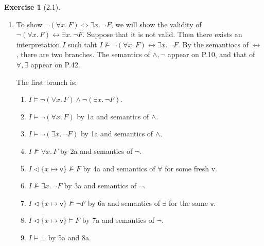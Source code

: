 \documentclass[12pt, psamsfonts]{amsart}
\theoremstyle{definition}
\newtheorem*{exer}{Exercise}
\theoremstyle{remark}
\numberwithin{equation}{subsection}
\begin{document}
\begin{exer}[2.1]
    $ $
    \begin{enumerate}[label=(\alph*)]
        \item
            To show $\neg(\forall x.\, F) \Leftrightarrow \exists x.\, \neg F$, we will show the validity of $\neg(\forall x.\, F) \leftrightarrow \exists x.\, \neg F$.
            Suppose that it is not valid.
            Then there exists an interpretation $I$ such taht $I \not\models \neg(\forall x.\, F) \leftrightarrow \exists x.\, \neg F$.
            By the semantiocs of $\leftrightarrow$, there are two branches.
            The semantics of $\land, \neg$ appear on P.10, and that of $\forall, \exists$ appear on P.42.

            The first branch is:
            \begin{enumerate}[label=\arabic*a.]
                \item %
                    $I \models \neg(\forall x.\, F) \land \neg(\exists x.\, \neg F)$.
                \item %
                    $I \models \neg(\forall x.\, F)$ by 1a and semantics of $\land$.
                \item %
                    $I \models \neg(\exists x.\, \neg F)$ by 1a and semantics of $\land$.
                \item %
                    $I \not\models \forall x.\, F$ by 2a and semantics of $\neg$.
                \item %
                    $I \vartriangleleft \{ x \mapsto \textsf{v} \} \not\models F$ by 4a and semantics of $\forall$ for some fresh \textsf{v}.
                \item %
                    $I \not \models \exists x.\, \neg F$ by 3a and semantics of $\neg$.
                \item %
                    $I \vartriangleleft \{ x \mapsto \textsf{v} \} \not\models \neg F$ by 6a and semantics of $\exists$ for the same $\textsf{v}$.
                \item %
                    $I \vartriangleleft \{ x \mapsto \textsf{v} \} \models F$ by 7a and semantics of $\neg$.
                \item %
                    $I \models \bot$ by 5a and 8a.
            \end{enumerate}


\end{enumerate}
\end{exer}
\end{document}
